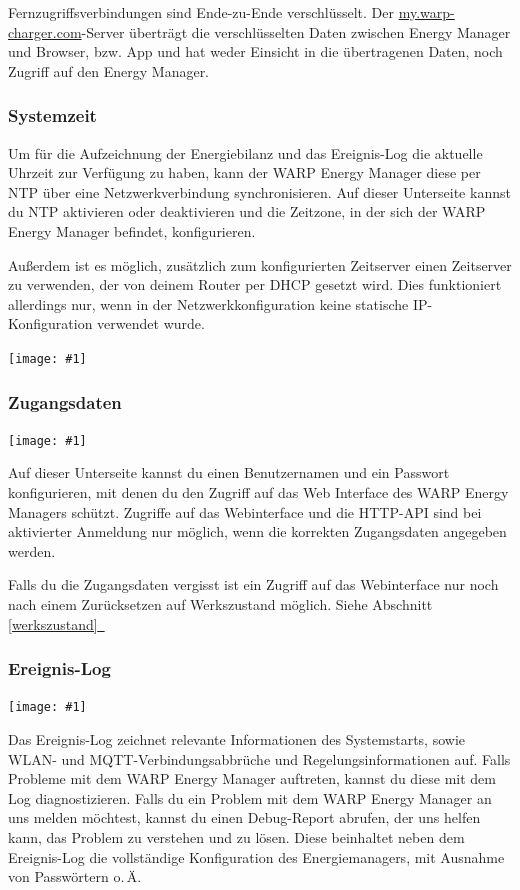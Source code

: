 \documentclass[a4paper,10pt]{article}
\newcommand{\hint}[1]{\begin{tcolorbox}[colback=boxgray,colframe=black,coltext=
white,title=Hinweis,left*=2mm,right*=2mm,boxsep=1mm,bottom=1mm,top=1mm]#1\end{tcolorbox}}
\newcommand{\gfx}[1]{\texttt{[image: \#1]}}
\newcommand*{\fullref}[1]{Abschnitt \hyperref[{#1}]{\ref*{#1}~\nameref*{#1}}}
\begin{document}
\begin{multicols*}{2}

    \hint{Fernzugriffsverbindungen sind Ende-zu-Ende verschlüsselt. Der \url{my.warp-charger.com}-Server überträgt die verschlüsselten Daten zwischen Energy Manager und Browser, bzw. App und hat weder Einsicht in die übertragenen Daten, noch Zugriff auf den Energy Manager.}


	\subsubsection{Systemzeit}\label{ntp}
	Um für die Aufzeichnung der Energiebilanz und das Ereignis-Log die aktuelle Uhrzeit zur
	Verfügung zu haben, kann der WARP Energy Manager diese per NTP über
	eine Netzwerkverbindung synchronisieren. Auf dieser Unterseite kannst du NTP aktivieren oder deaktivieren und die Zeitzone, in der sich der WARP Energy Manager befindet, konfigurieren.

	Außerdem ist es möglich, zusätzlich zum konfigurierten Zeitserver einen Zeitserver zu verwenden, der von deinem Router per DHCP gesetzt wird. Dies funktioniert allerdings nur,
	wenn in der Netzwerkkonfiguration keine statische IP-Konfiguration verwendet wurde.

	\gfx{./img/resized/web_ntp}


	\subsubsection{Zugangsdaten}

	\gfx{./img/resized/web_authentication.png}

	Auf dieser Unterseite kannst du einen Benutzernamen und ein Passwort konfigurieren, mit denen du den Zugriff auf das Web Interface
	des WARP Energy Managers schützt. Zugriffe auf das Webinterface und die HTTP-API sind bei aktivierter Anmeldung nur möglich, wenn
	die korrekten Zugangsdaten angegeben werden.
	\hint{Falls du die Zugangsdaten vergisst ist ein Zugriff auf das Webinterface nur noch nach einem Zurücksetzen auf Werkszustand möglich. Siehe \fullref{werkszustand}}

	\subsubsection{Ereignis-Log}
	\gfx{./img/resized/web_event_log}

	Das Ereignis-Log zeichnet relevante Informationen des Systemstarts, sowie WLAN- und MQTT-Verbindungsabbrüche und Regelungsinformationen auf.
	Falls Probleme mit dem WARP Energy Manager auftreten, kannst du diese mit dem Log diagnostizieren.
	Falls du ein Problem mit dem WARP Energy Manager an uns melden möchtest, kannst du einen Debug-Report abrufen,
	der uns helfen kann, das Problem zu verstehen und zu lösen. Diese beinhaltet neben dem Ereignis-Log die vollständige
	Konfiguration des Energiemanagers, mit Ausnahme von Passwörtern o.\,Ä.


\end{multicols*}
\end{document}

